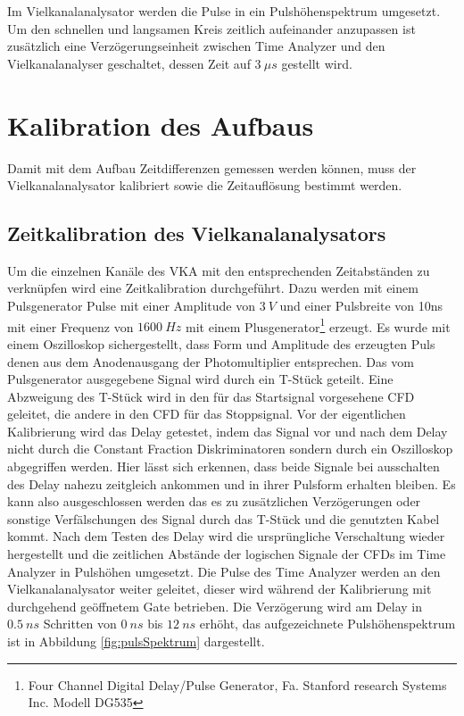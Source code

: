 \documentclass[a4paper,12pt]{article}
\begin{document}
Im Vielkanalanalysator werden die Pulse in ein Pulshöhenspektrum umgesetzt.
Um den schnellen und langsamen Kreis zeitlich aufeinander 
anzupassen ist zusätzlich eine Verzögerungseinheit zwischen Time Analyzer und den Vielkanalanalyser geschaltet, dessen Zeit auf $\SI{3}{μs}$ gestellt wird.

\section{Kalibration des Aufbaus}
Damit mit dem Aufbau Zeitdifferenzen gemessen werden können, muss der Vielkanalanalysator kalibriert
sowie die Zeitauflösung bestimmt werden.
\subsection{Zeitkalibration des Vielkanalanalysators}
Um die einzelnen Kanäle des VKA mit den entsprechenden Zeitabständen zu verknüpfen wird eine Zeitkalibration durchgeführt. Dazu werden
mit einem Pulsgenerator Pulse mit einer Amplitude von $\SI{3}{V}$ und einer Pulsbreite von 10ns mit
einer Frequenz von $\SI{1600}{Hz}$ mit einem 
Plusgenerator\footnote{Four Channel Digital Delay/Pulse Generator, Fa. Stanford research Systems Inc. Modell DG535}
erzeugt.
Es wurde mit einem Oszilloskop sichergestellt, dass Form und Amplitude des erzeugten Puls denen aus dem Anodenausgang der Photomultiplier
entsprechen. Das vom Pulsgenerator ausgegebene Signal wird durch ein T-Stück geteilt. Eine Abzweigung des T-Stück wird in den für das Startsignal vorgesehene
CFD geleitet, die andere in den CFD für das Stoppsignal. Vor der eigentlichen Kalibrierung wird das Delay getestet, indem
das Signal vor und nach dem Delay nicht durch die Constant Fraction Diskriminatoren sondern durch ein Oszilloskop abgegriffen werden. Hier lässt sich erkennen,
dass beide Signale bei ausschalten des Delay nahezu zeitgleich ankommen und in ihrer Pulsform erhalten bleiben. Es kann also ausgeschlossen werden das es zu
zusätzlichen Verzögerungen oder sonstige Verfälschungen des Signal durch das T-Stück und die genutzten Kabel kommt.
Nach dem Testen des Delay wird die ursprüngliche Verschaltung wieder hergestellt und die zeitlichen Abstände der logischen Signale der CFDs im Time Analyzer
in Pulshöhen umgesetzt. Die Pulse des Time Analyzer werden an den Vielkanalanalysator weiter geleitet, dieser wird während der Kalibrierung mit
durchgehend geöffnetem Gate betrieben. Die Verzögerung wird am Delay in $\SI{0.5}{ns}$ Schritten von $\SI{0}{ns}$ bis $\SI{12}{ns}$ erhöht, das aufgezeichnete Pulshöhenspektrum
ist in Abbildung \ref{fig:pulsSpektrum} dargestellt.
\end{document}

